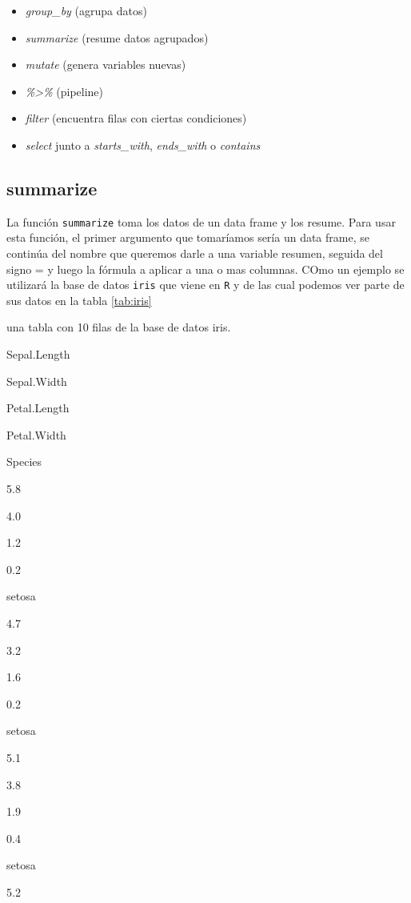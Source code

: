 \documentclass[]{book}
\providecommand{\tightlist}{%
  \setlength{\itemsep}{0pt}\setlength{\parskip}{0pt}}
\begin{document}
\begin{itemize}
\tightlist
\item
  \emph{group\_by} (agrupa datos)
\item
  \emph{summarize} (resume datos agrupados)
\item
  \emph{mutate} (genera variables nuevas)
\item
  \emph{\%\textgreater{}\%} (pipeline)
\item
  \emph{filter} (encuentra filas con ciertas condiciones)
\item
  \emph{select} junto a \emph{starts\_with}, \emph{ends\_with} o
  \emph{contains}
\end{itemize}

\hypertarget{summarize}{%
\subsection{summarize}\label{summarize}}

La función \texttt{summarize} toma los datos de un data frame y los
resume. Para usar esta función, el primer argumento que tomaríamos sería
un data frame, se continúa del nombre que queremos darle a una variable
resumen, seguida del signo = y luego la fórmula a aplicar a una o mas
columnas. COmo un ejemplo se utilizará la base de datos \texttt{iris}
\citep{anderson1935irises} que viene en \texttt{R} y de las cual podemos
ver parte de sus datos en la tabla \ref{tab:iris}

\label{tab:iris}una tabla con 10 filas de la base de datos iris.

Sepal.Length

Sepal.Width

Petal.Length

Petal.Width

Species

5.8

4.0

1.2

0.2

setosa

4.7

3.2

1.6

0.2

setosa

5.1

3.8

1.9

0.4

setosa

5.2
\end{document}
